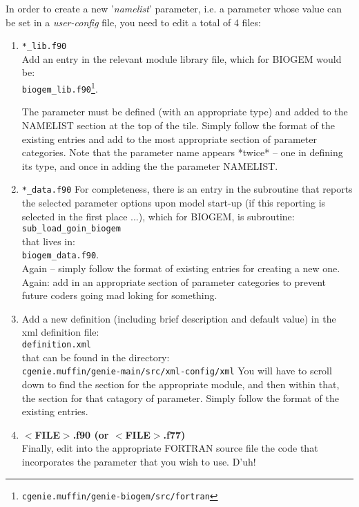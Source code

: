 \documentclass[11pt,fleqn]{book} %
\begin{document}
In order to create a new '\textit{namelist}' parameter, i.e. a parameter whose value can be set in a \textit{user-config} file, you need to edit a total of 4 files:
\begin{enumerate}

        \item \texttt{*\_lib.f90}
        \\Add an entry in the relevant module library file, which for BIOGEM would be:
        \\\texttt{biogem\_lib.f90}\footnote{\texttt{cgenie.muffin/genie-biogem/src/fortran}}.

        The parameter must be defined (with an appropriate type) and added to the NAMELIST section at the top of the tile. Simply follow the format of the existing entries and add to the most appropriate section of parameter categories.
        Note that the parameter name appears *twice* -- one in defining its type, and once in adding the the parameter NAMELIST.

        \item \texttt{*\_data.f90}
        For completeness, there is an entry in the subroutine that reports the selected parameter options upon model start-up (if this reporting is selected in the first place ...), which for BIOGEM, is subroutine:
        \\\texttt{sub\_load\_goin\_biogem}
        \\that lives in:
        \\\texttt{biogem\_data.f90}.\\Again -- simply follow the format of existing entries for creating a new one.        Again: add in an appropriate section of parameter categories to prevent future coders going mad loking for something.

        \item Add a new definition (including brief description and default value) in the xml definition file:
        \\\texttt{definition.xml}
        \\that can be found in the directory:
        \\\texttt{cgenie.muffin/genie-main/src/xml-config/xml}
        You will have to scroll down to find the section for the appropriate module, and then within that, the section for that catagory of parameter.
        Simply follow the format of the existing entries.

        \item \textbf{$<$FILE$>$.f90 (or $<$FILE$>$.f77)}
        \\Finally, edit into the appropriate FORTRAN source file the code that incorporates the parameter that you wish to use.
        D'uh!

\end{enumerate}
\end{document}
